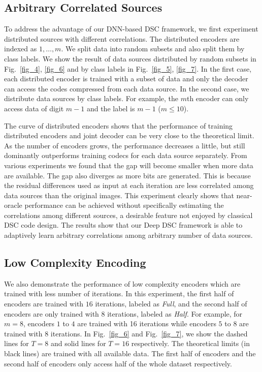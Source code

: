 \documentclass[10pt,twocolumn,letterpaper]{article}
\begin{document}
\subsection{Arbitrary Correlated Sources}
To address the advantage of our DNN-based DSC framework, we first experiment distributed sources with different correlations. The distributed encoders are indexed as $1, \ldots, m$. We split data into random subsets and also split them by class labels. We show the result of data sources distributed by random subsets in Fig.~\ref{fig_4}, \ref{fig_6} and by class labels in Fig.~\ref{fig_5}, \ref{fig_7}. In the first case, each distributed encoder is trained with a subset of data and only the decoder can access the codes compressed from each data source. In the second case, we distribute data sources by class labels. For example, the $m$th encoder can only access data of digit $m-1$ and the label is $m-1$ ($m\leq 10$). %

The curve of distributed encoders shows that the performance of training distributed encoders and joint decoder can be very close to the theoretical limit. As the number of encoders grows, the performance decreases a little, but still dominantly outperforms training codecs for each data source separately. From various experiments we found that the gap will become smaller when more data are available. The gap also diverges as more bits are generated. This is because the residual differences used as input at each iteration are less correlated among data sources than the original images. This experiment clearly shows that near-oracle performance can be achieved without specifically estimating the correlations among different sources, a desirable feature not enjoyed by classical DSC code design. The results show that our Deep DSC framework is able to adaptively learn arbitrary correlations among arbitrary number of data sources. 

\subsection{Low Complexity Encoding}
We also demonstrate the performance of low complexity encoders which are trained with less number of iterations. In this experiment, the first half of encoders are trained with $16$ iterations, labeled as \textit{Full}, and the second half of encoders are only trained with $8$ iterations, labeled as \textit{Half}. For example, for $m=8$, encoders $1$ to $4$ are trained with 16 iterations while encoders $5$ to $8$ are trained with 8 iterations. In Fig.~\ref{fig_6} and Fig.~\ref{fig_7}, we show the dashed lines for $T=8$ and solid lines for $T=16$ respectively. The theoretical limits (in black lines) are trained with all available data. The first half of encoders and the second half of encoders only access half of the whole dataset respectively.
\end{document}
